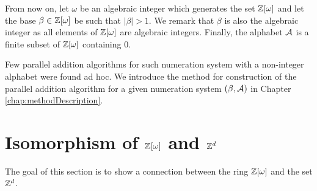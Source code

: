 From now on, let $\omega$ be an algebraic integer  which generates the set $\mathbb{Z}[\omega]$ and let the base $\beta\in\mathbb{Z}[\omega]$ be such that $|\beta|>1$. We remark that $\beta$ is also the algebraic integer as all elements of $\mathbb{Z}[\omega]$ are algebraic integers. Finally, the alphabet $\mathcal{A}$ is a finite subset of $\mathbb{Z}[\omega]$ containing 0.

Few parallel addition algorithms for such numeration system with a non-integer alphabet were found ad hoc. We introduce the method for construction of the parallel addition algorithm for a given numeration system $(\beta,\mathcal{A})$ in Chapter \ref{chap:methodDescription}. 
  


\section{\texorpdfstring{Isomorphism of $\mathbb{Z}[\omega]$ and $\mathbb{Z}^{d}$}{Isomorphism of Z[omega] and Zd}}
The goal of this section is to show a connection between the ring $\mathbb{Z}[\omega]$ and the set $\mathbb{Z}^d$. %

